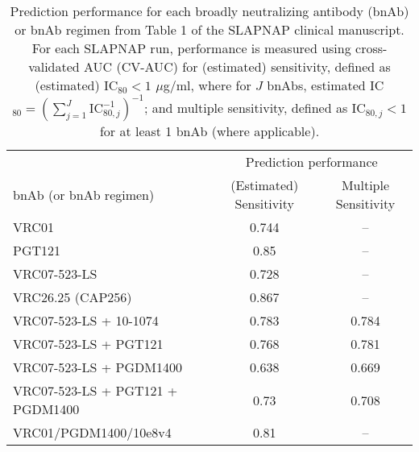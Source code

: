 \documentclass[10pt]{article}
\begin{document}
\begin{table}
    \centering
    \caption{Prediction performance for each broadly neutralizing antibody (bnAb) or bnAb regimen from Table 1 of the SLAPNAP clinical manuscript. For each SLAPNAP run, performance is measured using cross-validated AUC (CV-AUC) for (estimated) sensitivity, defined as (estimated) IC$_{80} < 1$ $\mu$g/ml, where for $J$ bnAbs, estimated IC$_{80} = \left(\sum_{j=1}^J \text{IC}_{80,j}^{-1}\right)^{-1}$; and multiple sensitivity, defined as $\text{IC}_{80,j} < 1$ for at least 1 bnAb (where applicable).}
    \begin{tabular}{l|cc}
        & \multicolumn{2}{c}{Prediction performance} \\
        bnAb (or bnAb regimen) & (Estimated) Sensitivity & Multiple Sensitivity \\
        \hline
        VRC01 & 0.744 & -- \\
        PGT121 & 0.85 & -- \\
        VRC07-523-LS & 0.728 & --\\
        VRC26.25 (CAP256) & 0.867 & --\\
        VRC07-523-LS + 10-1074 & 0.783 & 0.784 \\
        VRC07-523-LS + PGT121 & 0.768 & 0.781 \\
        VRC07-523-LS + PGDM1400 & 0.638 & 0.669 \\
        VRC07-523-LS + PGT121 + PGDM1400 & 0.73 & 0.708 \\
        VRC01/PGDM1400/10e8v4 & 0.81 & --
    \end{tabular}
    \label{tab:perf-binary}
\end{table}
\end{document}
